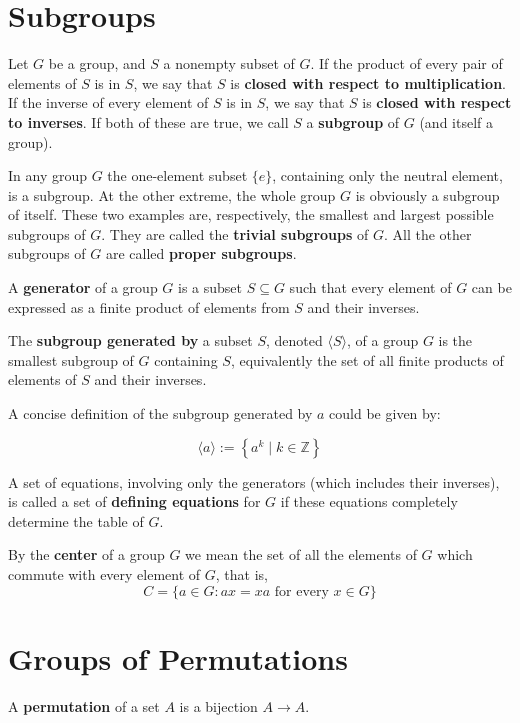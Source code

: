 \documentclass[11pt]{article}
\begin{document}
\section{Subgroups}\label{subgroups}

Let \(G\) be a group, and \(S\) a nonempty subset of \(G\). If the
product of every pair of elements of \(S\) is in \(S\), we say that
\(S\) is \textbf{closed with respect to multiplication}. If the inverse
of every element of \(S\) is in \(S\), we say that \(S\) is
\textbf{closed with respect to inverses}. If both of these are true, we
call \(S\) a \textbf{subgroup} of \(G\) (and itself a group).

In any group \(G\) the one-element subset \(\{e\}\), containing only the
neutral element, is a subgroup. At the other extreme, the whole group
\(G\) is obviously a subgroup of itself. These two examples are,
respectively, the smallest and largest possible subgroups of \(G\). They
are called the \textbf{trivial subgroups} of \(G\). All the other
subgroups of \(G\) are called \textbf{proper subgroups}.

A \textbf{generator} of a group \(G\) is a subset \(S \subseteq G\) such
that every element of \(G\) can be expressed as a finite product of
elements from \(S\) and their inverses.

The \textbf{subgroup generated by} a subset \(S\), denoted
\(\langle S \rangle\), of a group \(G\) is the smallest subgroup of
\(G\) containing \(S\), equivalently the set of all finite products of
elements of \(S\) and their inverses.

A concise definition of the subgroup generated by \(a\) could be given
by:

\[
\langle a\rangle:=\left\{a^k \mid k \in \mathbb{Z}\right\}
\]

A set of equations, involving only the generators (which includes their
inverses), is called a set of \textbf{defining equations} for \(G\) if
these equations completely determine the table of \(G\).

By the \textbf{center} of a group \(G\) we mean the set of all the
elements of \(G\) which commute with every element of \(G\), that is,
\[C = \{a \in G : ax = xa \text{ for every } x \in G\}\]

\section{Groups of Permutations}\label{groups-of-permutations}

A \textbf{permutation} of a set \(A\) is a bijection
\(A \rightarrow A\).
\end{document}
